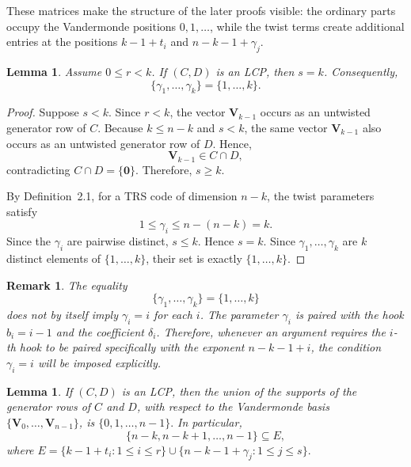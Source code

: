 \documentclass[12pt,draftcls,journal,onecolumn]{IEEEtran}
\newtheorem{lemma}[theorem]{Lemma}
\newtheorem{remark}[theorem]{Remark}
\begin{document}
These matrices make the structure of the later proofs visible: the ordinary parts occupy the Vandermonde positions \(0,1,\ldots\), while the twist terms create additional entries at the positions \(k-1+t_i\) and \(n-k-1+\gamma_j\).

\begin{lemma}
Assume \(0\le r<k\). If \((C,D)\) is an LCP, then \(s=k\). Consequently,
\[
\{\gamma_1,\ldots,\gamma_k\}=\{1,\ldots,k\}.
\]
\end{lemma}

\begin{proof}
Suppose \(s<k\). Since \(r<k\), the vector \(\mathbf{V}_{k-1}\) occurs as an untwisted generator row of \(C\). Because \(k\le n-k\) and \(s<k\), the same vector \(\mathbf{V}_{k-1}\) also occurs as an untwisted generator row of \(D\). Hence,
\[
\mathbf{V}_{k-1}\in C\cap D,
\]
contradicting \(C\cap D=\{\mathbf{0}\}\). Therefore, \(s\ge k\).

By Definition~2.1, for a TRS code of dimension \(n-k\),
the twist parameters satisfy
\[
1\le \gamma_i\le n-(n-k)=k.
\]
Since the \(\gamma_i\) are pairwise distinct, \(s\le k\). Hence \(s=k\). Since \(\gamma_1,\ldots,\gamma_k\) are \(k\) distinct elements of \(\{1,\ldots,k\}\), their set is exactly \(\{1,\ldots,k\}\).
\end{proof}

\begin{remark}
The equality
\[
\{\gamma_1,\ldots,\gamma_k\}=\{1,\ldots,k\}
\]
does not by itself imply \(\gamma_i=i\) for each \(i\).
The parameter \(\gamma_i\) is paired with the hook \(b_i=i-1\)
and the coefficient \(\delta_i\). Therefore, whenever an argument
requires the \(i\)-th hook to be paired specifically with the exponent
\(n-k-1+i\), the condition \(\gamma_i=i\) will be imposed explicitly.
\end{remark}

\begin{lemma}
If \((C,D)\) is an LCP, then the union of the supports of the
generator rows of \(C\) and \(D\), with respect to the Vandermonde
basis \(\{\mathbf{V}_0,\ldots,\mathbf{V}_{n-1}\}\), is
\(
\{0,1,\ldots,n-1\}.
\)
In particular,
\[
\{n-k,n-k+1,\ldots,n-1\}\subseteq E,
\]
where
\(
E=
\{k-1+t_i:1\le i\le r\}
\cup
\{n-k-1+\gamma_j:1\le j\le s\}.
\)
\end{lemma}
\end{document}
